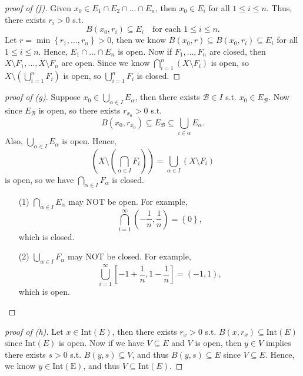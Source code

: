 \begin{proof}[proof of (f)]
    Given \(x_0 \in E_1 \cap E_2 \cap \dots \cap E_n\), then \(x_0 \in E_i\) for all \(1 \le i \le n\). Thus, there exists \(r_i > 0\) s.t. 
    \[
        B(x_0, r_i) \subseteq E_i \quad \text{for each } 1 \le i \le n.
    \]   Let \(r = \min \left\{ r_1, \dots , r_n \right\} > 0\), then we know \(B(x_0, r) \subseteq B(x_0, r_i) \subseteq E_i\) for all \(1 \le i \le n\). Hence, \(E_1 \cap \dots \cap E_n\) is open. Now if \(F_1, \dots , F_n\) are closed, then \(X\setminus F_1, \dots , X\setminus F_n\) are open. Since we know \(\bigcap_{i=1}^{n} (X \setminus F_i) \) is open, so \(X\setminus \left( \bigcup_{i=1}^{n}F_i \right)  \) is open, so \(\bigcup_{i=1}^{n}F_i\) is closed.        
\end{proof}
\begin{proof}[proof of (g)]
    Suppose \(x_0 \in \bigcup_{\alpha \in I} E_\alpha  \), then there exists \(\mathcal{B} \in I\) s.t. \(x_0 \in E_{\mathcal{B} }\). Now since \(E_{\mathcal{B} }\) is open, so there exists \(r_{x_0} > 0\) s.t. 
    \[
        B(x_0, r_{x_0}) \subseteq E_{\mathcal{B} } \subseteq \bigcup_{i \in \alpha } E_\alpha . 
    \]     Also, \(\bigcup_{\alpha \in I} E_\alpha  \) is open. Hence, 
    \[
        \left( X \setminus \left( \bigcap_{\alpha \in I} F_i  \right)  \right) = \bigcup_{\alpha \in I} \left( X \setminus F_i \right) 
    \] is open, so we have \(\bigcap_{\alpha \in I} F_\alpha  \) is closed. 

    \begin{remark}
        \vphantom{text}
        \begin{itemize}
            \item [(1)] \(\bigcap_{\alpha \in I} E_\alpha  \) may NOT be open. For example,
            \[
                \bigcap_{i=1}^{\infty} \left( - \frac{1}{n}, \frac{1}{n} \right) = \left\{ 0 \right\},
            \]
            which is closed. 
            \item [(2)] \(\bigcup_{\alpha \in I} F_\alpha \) may NOT be closed.  For example, 
            \[
                \bigcup_{i=1}^{\infty} \left[ -1 + \frac{1}{n}, 1 - \frac{1}{n}\right] = (-1, 1),
            \] which is open.
        \end{itemize}
    \end{remark}
\end{proof}
\begin{proof}[proof of (h)]
    Let \(x \in \mathrm{Int}(E) \), then there exists \(r_x > 0\) s.t. \(B(x, r_x) \subseteq \mathrm{Int}(E)\) since \(\mathrm{Int}(E) \) is open. Now if we have \(V \subseteq E\) and \(V\) is open, then \(y \in V\) implies there exists \(s > 0\) s.t. \(B(y, s) \subseteq V\), and thus \(B(y, s) \subseteq E\) since \(V \subseteq E\). Hence, we know \(y \in \mathrm{Int(E)} \), and thus \(V \subseteq \mathrm{Int}(E) \).        
\end{proof}

